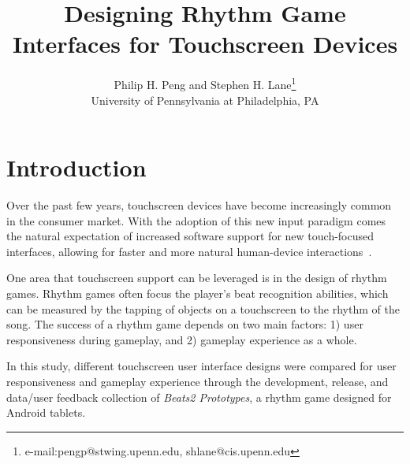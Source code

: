 \documentclass[annual]{acmsiggraph}
\title{Designing Rhythm Game Interfaces for Touchscreen Devices}
\author{Philip H. Peng and Stephen H. Lane\thanks{e-mail:pengp@stwing.upenn.edu, shlane@cis.upenn.edu}\\University of Pennsylvania at Philadelphia, PA}
\begin{document}

%


\maketitle


\section{Introduction}
\vspace{-6pt}
Over the past few years, touchscreen devices have become increasingly common in the consumer market. With the adoption of this new input paradigm comes the natural expectation of increased software support for new touch-focused interfaces, allowing for faster and more natural human-device interactions~\cite{hayes_thesis}.

One area that touchscreen support can be leveraged is in the design of rhythm games. Rhythm games often focus the player's beat recognition abilities, which can be measured by the tapping of objects on a touchscreen to the rhythm of the song. The success of a rhythm game depends on two main factors: 1) user responsiveness during gameplay, and 2) gameplay experience as a whole.

In this study, different touchscreen user interface designs were compared for user responsiveness and gameplay experience through the development, release, and data/user feedback collection of \textit{Beats2 Prototypes}, a rhythm game designed for Android tablets.
\end{document}
